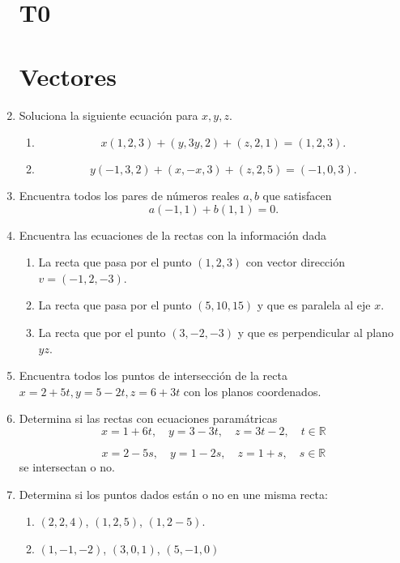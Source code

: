 \documentclass{article}
\theoremstyle{definition}
\begin{document}
\begin{enumerate}


  \section*{T0}

\section*{Vectores}


    
 \item Soluciona la siguiente ecuaci\'on para $x,y,z$.
    \begin{enumerate}
    \item
      $$
      x(1,2,3)+(y,3y,2)+(z,2,1)=(1,2,3).
     $$
    \item
      $$
     y(-1,3,2)+(x,-x,3)+(z,2,5)=(-1,0,3).
      $$
    \end{enumerate}

  \item Encuentra todos los pares de n\'umeros reales $a,b$ que satisfacen
    $$
    a(-1,1)+b(1,1)=0.
    $$



  \item Encuentra las ecuaciones de la rectas con la informaci\'on dada
    \begin{enumerate}
    \item La recta que pasa por el punto $(1,2,3)$ con vector direcci\'on $v=(-1,2,-3)$.
    \item La recta que pasa por el punto $(5,10,15)$ y que es paralela al eje $x$.
      \item La recta que por el punto $(3,-2,-3)$ y que es perpendicular al plano $yz$.
    \end{enumerate}
    
    \item Encuentra todos los puntos de intersecci\'on de la recta $x=2+5t,y=5-2t,z=6+3t$ con los planos coordenados.

      
    \item Determina si las rectas con ecuaciones param\'atricas
      $$
      x=1+6t, \quad y=3-3t, \quad z=3t-2, \quad t\in \mathbb{R}
      $$
      
      $$
      x=2-5s, \quad y=1-2s,\quad z=1+s, \quad s \in \mathbb{R}
      $$
      se intersectan o no.
 

    \item Determina si los puntos dados est\'an  o no en une misma recta:
      \begin{enumerate}
      \item $(2,2,4)$, $(1,2,5)$, $(1,2-5)$.
      \item $(1,-1,-2)$, $(3,0,1)$, $(5,-1,0)$
      \end{enumerate}
          

\end{enumerate}
\end{document}
